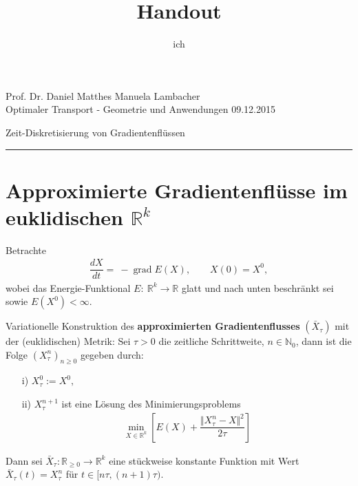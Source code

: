 \documentclass[11pt,a4paper,notitlepage]{scrreprt}
\author{ich}
\title{Handout}
\newcommand{\RR}{\mathbb{R}}
\newcommand{\NN}{\mathbb{N}}
\newcommand{\grad}{\operatorname{grad}}
\begin{document}
\parindent 0pt



\pagestyle{empty}



 Prof. Dr. Daniel Matthes \hfill Manuela Lambacher\\
 Optimaler Transport - Geometrie und Anwendungen \hfill 09.12.2015
 \begin{center}
  {\huge{Zeit-Diskretisierung von Gradientenflüssen}} 
 \end{center}
 \vspace{4pt}
 \hrule
 
\renewcommand{\thechapter}{\arabic{section}}
\renewcommand{\thesection}{\arabic{section}}
\section{Approximierte Gradientenflüsse im euklidischen $\RR^k$}

Betrachte \begin{eqnarray}
\dfrac{dX}{dt}=~-\grad E(X),~~~~~~~~~X(0)=X^0, \label{eq1}
\end{eqnarray} wobei das Energie-Funktional $E:~\RR^k\to\RR$ glatt und nach unten beschränkt sei sowie ${E(X^0)<\infty}$. 
\vspace{14pt}

Variationelle Konstruktion des \textbf{approximierten Gradientenflusses} $(\bar{X}_\tau)$ mit der (euklidischen) Metrik:\newline
Sei $\tau > 0$ die zeitliche Schrittweite, $n\in\NN_0$, dann ist die Folge $\left( X^n_\tau \right)_{n\geq 0}$ gegeben durch:
\begin{itemize}
\item[i)]$X_\tau^0:=X^0,$
\item[ii)]$X_\tau^{n+1}$ ist eine Lösung des Minimierungsproblems
\begin{eqnarray}
\min_{X\in\RR^k}\left[E(X)+\dfrac{\Vert X_\tau^n-X\Vert^2}{2\tau}\right] \label{Min}
\end{eqnarray}
\end{itemize}
Dann sei $\bar{X}_\tau:\RR_{\geq0}\to\RR^k$ eine stückweise konstante Funktion mit Wert $\bar{X}_\tau(t)=X^n_\tau$ für ${t\in [n\tau,(n+1)\tau)}$. 

\vspace{12pt}
\end{document}
